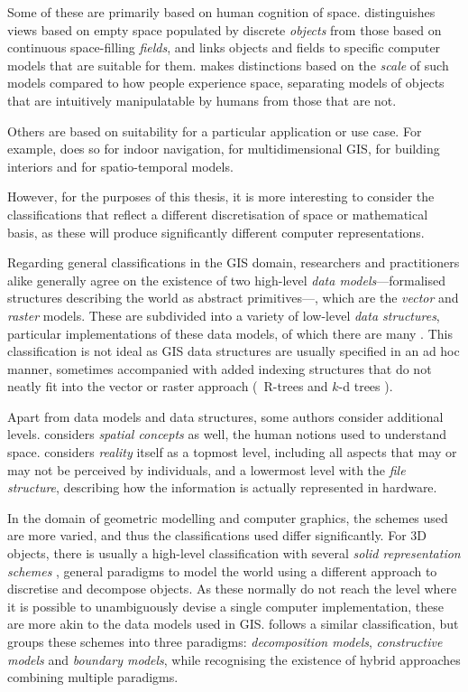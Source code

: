 Some of these are primarily based on human cognition of space.
\citet{Couclelis92} distinguishes views based on empty space populated by discrete \emph{objects} from those based on continuous space-filling \emph{fields}, and \citet{Goodchild92} links objects and fields to specific computer models that are suitable for them.
\citet{Freundschuh97} makes distinctions based on the \emph{scale} of such models compared to how people experience space, separating models of objects that are intuitively manipulatable by humans from those that are not.

Others are based on suitability for a particular application or use case.
For example, \citet{Afyouni11} does so for indoor navigation, \citet{Gold05} for multidimensional GIS, \citet{Dominguez11} for building interiors and \citet{Pelekis04} for spatio-temporal models.

However, for the purposes of this thesis, it is more interesting to consider the classifications that reflect a different discretisation of space or mathematical basis, as these will produce significantly different computer representations.

Regarding general classifications in the GIS domain, researchers and practitioners alike generally agree on the existence of two high-level \emph{data models}---formalised structures describing the world as abstract primitives---, which are the \emph{vector} and \emph{raster} models. 
These are subdivided into a variety of low-level \emph{data structures}, particular implementations of these data models, of which there are many \citep{vanKreveld97a}.
This classification is not ideal as GIS data structures are usually specified in an ad hoc manner, sometimes accompanied with added indexing structures that do not neatly fit into the vector or raster approach (\eg\ R-trees \citep{Guttman84} and $k$-d trees \citep{Bentley75}).

Apart from data models and data structures, some authors consider additional levels.
\citet{Frank92} considers \emph{spatial concepts} as well, the human notions used to understand space.
\citet{Peuquet84} considers \emph{reality} itself as a topmost level, including all aspects that may or may not be perceived by individuals, and a lowermost level with the \emph{file structure}, describing how the information is actually represented in hardware.

In the domain of geometric modelling and computer graphics, the schemes used are more varied, and thus the classifications used differ significantly.
For 3D objects, there is usually a high-level classification with several \emph{solid representation schemes} \citep{Requicha80,Hoffmann92,Foley95}, general paradigms to model the world using a different approach to discretise and decompose objects.
As these normally do not reach the level where it is possible to unambiguously devise a single computer implementation, these are more akin to the data models used in GIS.\@
\citet{Mantyla88} follows a similar classification, but groups these schemes into three paradigms: \emph{decomposition models}, \emph{constructive models} and \emph{boundary models}, while recognising the existence of hybrid approaches combining multiple paradigms.


